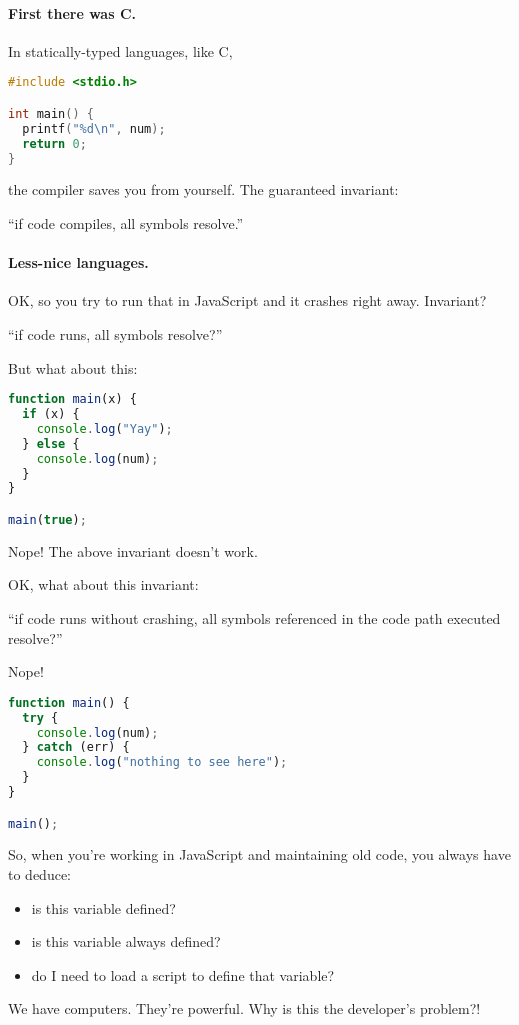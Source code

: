 \documentclass[11pt]{article}
\begin{document}
{\paragraph{First there was C.}
In statically-typed languages, like C,
\begin{lstlisting}[language=C]
#include <stdio.h>

int main() {
  printf("%d\n", num);
  return 0;
}
\end{lstlisting}
the compiler saves you from yourself.
The guaranteed invariant:
\begin{center}
``if code compiles, all symbols resolve.''
\end{center}

\paragraph{Less-nice languages.}
OK, so you try to run that in JavaScript and it crashes right away.
Invariant?
\begin{center}
 ``if code runs, all symbols resolve?''
\end{center}

But what about this:
\begin{lstlisting}[language=JavaScript]
function main(x) {
  if (x) {
    console.log("Yay");
  } else {
    console.log(num);
  }
}

main(true);
\end{lstlisting}
Nope! The above invariant doesn't work.

\newpage
OK, what about this invariant:
\begin{center}
``if code runs without crashing, all symbols referenced in the code path executed resolve?''
\end{center}

Nope!
\begin{lstlisting}[language=JavaScript]
function main() {
  try {
    console.log(num);
  } catch (err) {
    console.log("nothing to see here");
  }
}

main();
\end{lstlisting}

So, when you're working in JavaScript and maintaining old code, you always have to
deduce:
\begin{itemize}[noitemsep]
\item is this variable defined?
\item is this variable always defined?
\item do I need to load a script to define that variable?
\end{itemize}
We have computers. They're powerful. Why is this the developer's problem?!

}
\end{document}
